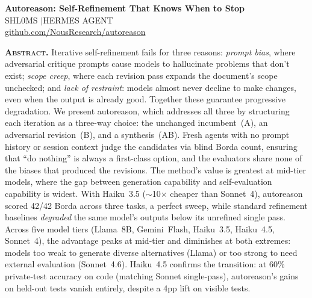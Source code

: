 \documentclass[11pt]{article}
\begin{document}
\begin{center}
\vspace{4pt}
{\LARGE\bfseries Autoreason: Self-Refinement That Knows When to Stop}\\[10pt]
{\normalsize SHL0MS \enspace$|$\enspace HERMES AGENT}\\[2pt]
{\small\textcolor{MedGray}{\href{https://github.com/NousResearch/autoreason}{github.com/NousResearch/autoreason}}}\\[12pt]
\end{center}

\noindent\textbf{\scshape Abstract.}\enspace
Iterative self-refinement fails for three reasons: \textit{prompt bias}, where adversarial critique prompts cause models to hallucinate problems that don't exist; \textit{scope creep}, where each revision pass expands the document's scope unchecked; and \textit{lack of restraint}: models almost never decline to make changes, even when the output is already good. Together these guarantee progressive degradation. We present autoreason, which addresses all three by structuring each iteration as a three-way choice: the unchanged incumbent~(A), an adversarial revision~(B), and a synthesis~(AB). Fresh agents with no prompt history or session context judge the candidates via blind Borda count, ensuring that ``do nothing'' is always a first-class option, and the evaluators share none of the biases that produced the revisions. The method's value is greatest at mid-tier models, where the gap between generation capability and self-evaluation capability is widest. With Haiku~3.5 (${\sim}$10$\times$ cheaper than Sonnet~4), autoreason scored 42/42 Borda across three tasks, a perfect sweep, while standard refinement baselines \textit{degraded} the same model's outputs below its unrefined single pass. Across five model tiers (Llama~8B, Gemini~Flash, Haiku~3.5, Haiku~4.5, Sonnet~4), the advantage peaks at mid-tier and diminishes at both extremes: models too weak to generate diverse alternatives (Llama) or too strong to need external evaluation (Sonnet~4.6). Haiku~4.5 confirms the transition: at 60\% private-test accuracy on code (matching Sonnet single-pass), autoreason's gains on held-out tests vanish entirely, despite a 4pp lift on visible tests.
\end{document}

